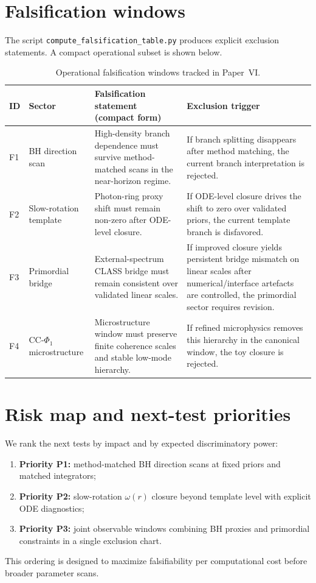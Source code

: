 \documentclass[aps,prd,onecolumn,nofootinbib,superscriptaddress]{revtex4-2}
\begin{document}
\section{Falsification windows}
The script \texttt{compute\_falsification\_table.py} produces explicit exclusion statements.
A compact operational subset is shown below.
\begin{table}[t]
  \centering
  \begin{tabular}{llll}
    \hline\hline
    ID & Sector & Falsification statement (compact form) & Exclusion trigger \\
    \hline
    F1 & BH direction scan &
    High-density branch dependence must survive method-matched scans in the near-horizon regime. &
    If branch splitting disappears after method matching, the current branch interpretation is rejected. \\
    F2 & Slow-rotation template &
    Photon-ring proxy shift must remain non-zero after ODE-level closure. &
    If ODE-level closure drives the shift to zero over validated priors, the current template branch is disfavored. \\
    F3 & Primordial bridge &
    External-spectrum CLASS bridge must remain consistent over validated linear scales. &
    If improved closure yields persistent bridge mismatch on linear scales after numerical/interface artefacts are controlled, the primordial sector requires revision. \\
    F4 & CC-$\Phi_1$ microstructure &
    Microstructure window must preserve finite coherence scales and stable low-mode hierarchy. &
    If refined microphysics removes this hierarchy in the canonical window, the toy closure is rejected. \\
    \hline\hline
  \end{tabular}
  \caption{Operational falsification windows tracked in Paper~VI.}
  \label{tab:paper6-falsification}
\end{table}

\section{Risk map and next-test priorities}
We rank the next tests by impact and by expected discriminatory power:
\begin{enumerate}
  \item \textbf{Priority P1:} method-matched BH direction scans at fixed priors and matched integrators;
  \item \textbf{Priority P2:} slow-rotation $\omega(r)$ closure beyond template level with explicit ODE diagnostics;
  \item \textbf{Priority P3:} joint observable windows combining BH proxies and primordial constraints in a single exclusion chart.
\end{enumerate}
This ordering is designed to maximize falsifiability per computational cost before broader parameter scans.
\end{document}
